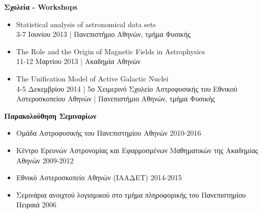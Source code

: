 \documentclass[a4paper,12pt,final]{memoir}
\newcommand{\SmallSep}{\vspace{0.25em}}
\newcommand{\CVItem}[2]
	{\textbf{\color{RoyalBlue} #1} #2}
\newcommand{\location}[1]{ %
\small{\color{headings}#1}}
\newenvironment{tightitemize} %
{\vspace{-\topsep}\begin{itemize}\itemsep1pt \parskip0pt \parsep0pt}
{\end{itemize}\vspace{-\topsep}}
\begin{document}
\clearpage
\framebreak
\framebreak

\CVItem{Σχολεία - Workshops}{}
\begin{tightitemize}
	\item Statistical analysis of astronomical data sets \\
	\location{3-7 Ιουνίου 2013 | Πανεπιστήμιο Αθηνών, τμήμα Φυσικής}
	\item The Role and the Origin of Magnetic Fields in Astrophysics \\
	\location{11-12 Μαρτίου 2013 | Ακαδημία Αθηνών}
	\item The Unification Model of Active Galactic Nuclei \\
	\location{4-5 Δεκεμβρίου 2014 | 5ο Χειμερινό Σχολείο Αστροφυσικής του Εθνικού Αστεροσκοπείου Αθηνών | Πανεπιστήμιο Αθηνών, τμήμα Φυσικής}
\end{tightitemize}
\SmallSep


\CVItem{Παρακολούθηση Σεμιναρίων}{}
\begin{tightitemize}
\item Ομάδα Αστροφυσικής του Πανεπιστημίου Αθηνών \location{2010-2016}
\item Κέντρο Ερευνών Αστρονομίας και Εφαρμοσμένων Μαθηματικών της Ακαδημίας Αθηνών \location{2009-2012}
\item Εθνικό Αστεροσκοπείο Αθηνών (ΙΑΑΔΕΤ) \location{2014-2015}
\item Σεμινάρια ανοιχτού λογισμικού στο τμήμα πληροφορικής του Πανεπιστημίου Πειραιά \location{2006}
\end{tightitemize}
\SmallSep


\end{document}
